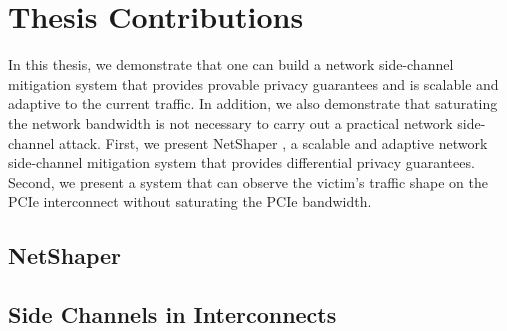 \section{Thesis Contributions}\label{sec:contributions}

In this thesis, we demonstrate that one can build a network side-channel mitigation system that provides provable privacy guarantees and is scalable and adaptive to the current traffic. In addition, we also demonstrate that saturating the network bandwidth is not necessary to carry out a practical network side-channel attack. First, we present NetShaper \cite{sabzi2024netshaper}, a scalable and adaptive network side-channel mitigation system that provides differential privacy guarantees. Second, we present a system that can observe the victim's traffic shape on the PCIe interconnect without saturating the PCIe bandwidth.

\subsection{NetShaper}\label{sec:netshaper}
\subsection{Side Channels in Interconnects}\label{sec:interconnect-sc-intro}